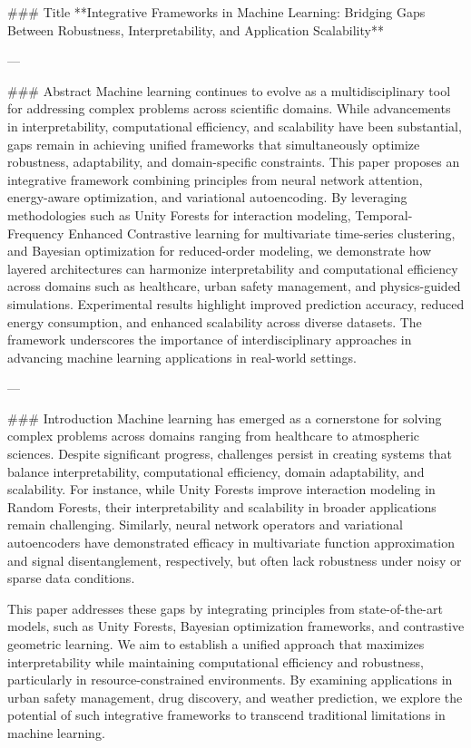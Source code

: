 ### Title
**Integrative Frameworks in Machine Learning: Bridging Gaps Between Robustness, Interpretability, and Application Scalability**

---

### Abstract
Machine learning continues to evolve as a multidisciplinary tool for addressing complex problems across scientific domains. While advancements in interpretability, computational efficiency, and scalability have been substantial, gaps remain in achieving unified frameworks that simultaneously optimize robustness, adaptability, and domain-specific constraints. This paper proposes an integrative framework combining principles from neural network attention, energy-aware optimization, and variational autoencoding. By leveraging methodologies such as Unity Forests for interaction modeling, Temporal-Frequency Enhanced Contrastive learning for multivariate time-series clustering, and Bayesian optimization for reduced-order modeling, we demonstrate how layered architectures can harmonize interpretability and computational efficiency across domains such as healthcare, urban safety management, and physics-guided simulations. Experimental results highlight improved prediction accuracy, reduced energy consumption, and enhanced scalability across diverse datasets. The framework underscores the importance of interdisciplinary approaches in advancing machine learning applications in real-world settings.

---

### Introduction
Machine learning has emerged as a cornerstone for solving complex problems across domains ranging from healthcare to atmospheric sciences. Despite significant progress, challenges persist in creating systems that balance interpretability, computational efficiency, domain adaptability, and scalability. For instance, while Unity Forests improve interaction modeling in Random Forests, their interpretability and scalability in broader applications remain challenging. Similarly, neural network operators and variational autoencoders have demonstrated efficacy in multivariate function approximation and signal disentanglement, respectively, but often lack robustness under noisy or sparse data conditions.

This paper addresses these gaps by integrating principles from state-of-the-art models, such as Unity Forests, Bayesian optimization frameworks, and contrastive geometric learning. We aim to establish a unified approach that maximizes interpretability while maintaining computational efficiency and robustness, particularly in resource-constrained environments. By examining applications in urban safety management, drug discovery, and weather prediction, we explore the potential of such integrative frameworks to transcend traditional limitations in machine learning.

